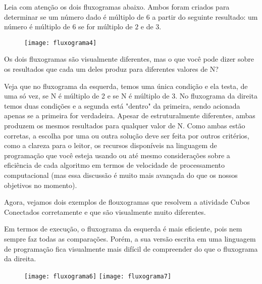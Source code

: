 \label{comp-arr4}

Leia com atenção os dois fluxogramas abaixo. Ambos foram criados para determinar se um número dado é múltiplo de 6 a partir do seguinte resultado: um número é múltiplo de $6$ se for múltiplo de $2$ e de $3$.

\begin{figure}[H]
\centering

\texttt{[image: fluxograma4]}
\end{figure}

\begin{reflection}
Os dois fluxogramas são visualmente diferentes, mas o que você pode dizer sobre os resultados que cada um deles produz para diferentes valores de N?
\end{reflection}

Veja que no fluxograma da esquerda, temos uma única condição e ela testa, de uma só vez, se N é múltiplo de 2 e se N é múltiplo de 3. No fluxograma da direita temos duas condições e a segunda está "dentro"{} da primeira, sendo acionada apenas se a primeira for verdadeira. Apesar de estruturalmente diferentes, ambas produzem os mesmos resultados para qualquer valor de N. Como ambas estão corretas, a escolha por uma ou outra solução deve ser feita por outros critérios, como a clareza para o leitor, os recursos disponíveis na linguagem de programação que você esteja usando ou até mesmo considerações sobre a eficiência de cada algoritmo em termos de velocidade de processamento computacional (mas essa discussão é muito mais avançada do que os nossos objetivos no momento).

Agora, vejamos dois exemplos de flouxogramas que resolvem a atividade Cubos Conectados corretamente e que são visualmente muito diferentes.

\clearmargin
\begin{texto}
{
	Em termos de execução, o fluxograma da esquerda é mais eficiente, pois nem sempre faz todas as comparações. Porém, a sua versão escrita em uma linguagem de programação fica visualmente mais difícil de compreender do que o fluxograma da direita.
}
\end{texto}

\begin{figure}[H]
\centering

\texttt{[image: fluxograma6]}
\hspace{1em}
\texttt{[image: fluxograma7]}
\end{figure}

